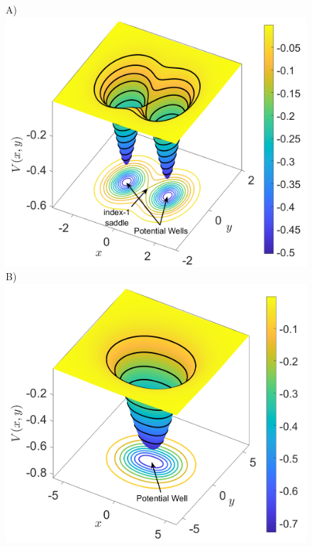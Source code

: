 \documentclass[10pt,aps,onecolumn,superscriptaddress]{revtex4-2}
\begin{document}
\begin{figure}[htbp]
	A)\includegraphics[scale=0.28]{PES_Cirque_w0_1div2_k_1_d_1.png}
	B)\includegraphics[scale=0.28]{PES_Cirque_w0_1div2_k_3_d_1.png}

\end{figure}
\end{document}
